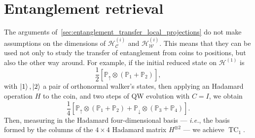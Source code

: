 \documentclass[
	aps, pra,
	superscriptaddress, twocolumn,
	floatfix,
	10pt
]{revtex4-1}
\newcommand{\on}[1]{\operatorname{#1}}
\newcommand{\PP}{\mathbb{P}}
\newcommand{\calC}{{\mathcal{C}}}
\newcommand{\calH}{{\mathcal{H}}}
\newcommand{\calW}{{\mathcal{W}}}
\newcommand{\HC}{\calH_\calC}
\newcommand{\HW}{\calH_\calW}
\begin{document}
\section{Entanglement retrieval}
\label{sec:entanglement_retrieval}

The arguments of~\cref{sec:entanglement_transfer_local_projections} do not make assumptions on the dimensions of $\HC^{(i)}$ and $\HW^{(i)}$. This means that they can be used not only to study the transfer of entanglement from coins to positions, but also the other way around.
For example, if the initial reduced state on $\calH^{(1)}$ is
\begin{equation}
    \frac12[\PP_\uparrow\otimes (\PP_1+\PP_2)],
\end{equation}
with $\ket1,\ket2$ a pair of orthonormal walker's states, then applying an Hadamard operation $H$ to the coin, and two steps of QW evolution with $C=I$, we obtain
\begin{equation}
    \frac14[\PP_\uparrow\otimes(\PP_1+\PP_2) + \PP_\downarrow\otimes(\PP_3+\PP_4)].
\end{equation}
Then, measuring in the Hadamard four-dimensional basis --- \textit{i.e.}, the basis formed by the columns of the $4\times4$ Hadamard matrix $H^{\otimes2}$ --- we achieve $\on{TC}_1$.

\end{document}
